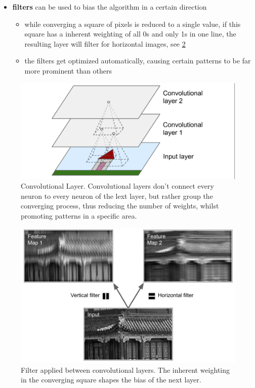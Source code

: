 \documentclass[12pt,a4paper]{article}
\begin{document}
\begin{itemize}
\begin{itemize}
  \end{itemize}
  \item \textbf{filters} can be used to bias the algorithm in a certain direction
  \begin{itemize}
    \item while converging a square of pixels is reduced to a single value, if this square has a inherent weighting of all 0s and only 1s in one line, the resulting layer will filter for horizontal images, see \ref{fig:filter}
    \item the filters get optimized automatically, causing certain patterns to be far more prominent than others
  \end{itemize}
\end{itemize}
\begin{figure}
  \centering
  \includegraphics[width=.5\linewidth]{Images/convolutional_layer.png}
  \caption[Convolutional Layer]{Convolutional Layer. Convolutional layers don't connect every neuron to every neuron of the lext layer, but rather group the converging process, thus reducing the number of weights, whilst promoting patterns in a specific area.}
  \label{fig:conv_lay}
\end{figure}

\begin{figure}
  \centering
  \includegraphics[width=.5\linewidth]{Images/filter.png}
  \caption[Filter applied between convolutional layers]{Filter applied between convolutional layers. The inherent weighting in the converging square shapes the bias of the next layer.}
  \label{fig:filter}
\end{figure}
\end{document}
